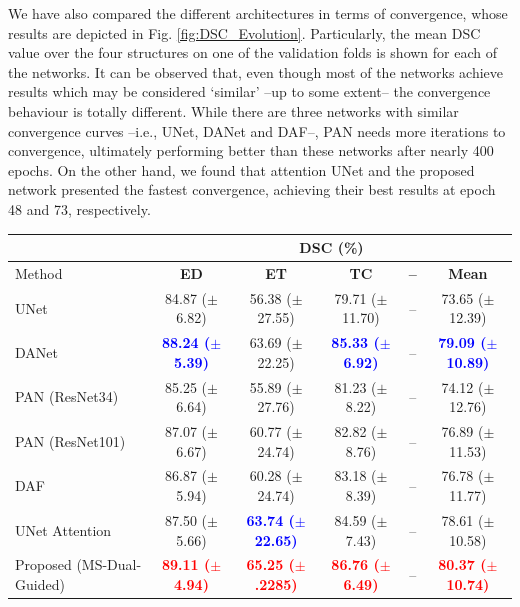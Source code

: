 \documentclass[journal]{IEEEtran}
\begin{document}
We have also compared the different architectures in terms of convergence, whose results are depicted in Fig. \ref{fig:DSC_Evolution}. Particularly, the mean DSC value over the four structures on one of the validation folds is shown for each of the networks. It can be observed that, even though most of the networks achieve results which may be considered `similar' --up to some extent-- the convergence behaviour is totally different. While there are three networks with similar convergence curves --i.e., UNet, DANet and DAF--, PAN needs more iterations to convergence, ultimately performing better than these networks after nearly 400 epochs. On the other hand, we found that attention UNet and the proposed network presented the fastest convergence, achieving their best results at epoch 48 and 73, respectively.


\begin{table}[t!]
\centering
\scriptsize
\begin{tabular}{lcccc|c}\\
\toprule
 & \multicolumn{5}{c}{\textbf{DSC} (\%)}\\
 \midrule
Method & \textbf{ED} & \textbf{ET} & \textbf{TC} & \textbf{--} & \textbf{Mean}  \\
 \midrule
UNet \cite{ronneberger2015u}  & 84.87 ($\pm$6.82)  & 56.38 ($\pm$27.55) & 79.71 ($\pm$11.70) & -- &  73.65 ($\pm$12.39) \\
DANet \cite{fu2018dual}  & \textcolor{blue}{\textbf{88.24  ($\pm$5.39)}} & 63.69 ($\pm$22.25)& \textcolor{blue}{\textbf{85.33 ($\pm$6.92)}} & --&  \textcolor{blue}{\textbf{79.09 ($\pm$10.89)}}   \\
PAN (ResNet34) \cite{li2018pyramid}   & 85.25 ($\pm$6.64)  & 55.89 ($\pm$27.76) & 81.23  ($\pm$8.22) & -- & 74.12 ($\pm$12.76) \\
PAN (ResNet101)\cite{li2018pyramid}   & 87.07 ($\pm$6.67)  & 60.77 ($\pm$24.74) & 82.82 ($\pm$8.76) & -- & 76.89 ($\pm$11.53) \\
DAF \cite{wang18d}  &  86.87 ($\pm$5.94) & 60.28 ($\pm$24.74)& 83.18 ($\pm$8.39) &  -- &  76.78 ($\pm$11.77)   \\
UNet Attention \cite{schlemper2019attention}  &   87.50 ($\pm$5.66) & \textcolor{blue}{\textbf{63.74 ($\pm$22.65)}}&  84.59 ($\pm$7.43) & -- &  78.61 ($\pm$10.58)   \\
Proposed (MS-Dual-Guided)  & \textcolor{red}{\textbf{89.11 ($\pm$4.94)}}  & \textcolor{red}{\textbf{65.25 ($\pm$.2285)}}& \textcolor{red}{\textbf{86.76 ($\pm$6.49)}}  & -- &  \textcolor{red}{\textbf{80.37 ($\pm$10.74)}} \\


\end{tabular}
\end{table}
\end{document}

